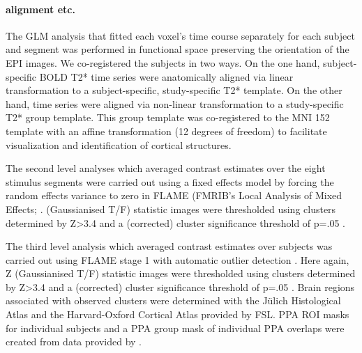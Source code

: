 \documentclass[english]{article}
\begin{document}
\paragraph{alignment etc.}

The GLM analysis that fitted each voxel's time course separately for each
subject and segment was performed in functional space preserving the orientation
of the EPI images.
We co-registered the subjects in two ways.
On the one hand, subject-specific BOLD T2* time series were anatomically aligned
via linear transformation to a subject-specific, study-specific T2* template.
On the other hand, time series were aligned via non-linear transformation to a
study-specific T2* group template.
This group template was co-registered to the MNI 152 template with an affine
transformation (12 degrees of freedom) to facilitate visualization and
identification of cortical structures.

The second level analyses which averaged contrast estimates over the eight
stimulus segments were carried out using a fixed effects model by forcing the
random effects variance to zero in FLAME (FMRIB's Local Analysis of Mixed
Effects; \citep{beckmann2003general, woolrich2004multilevel}.
(Gaussianised T/F) statistic images were thresholded using clusters determined
by Z>3.4 and a (corrected) cluster significance threshold of p=.05
\citep{worsley2001statistical}.

The third level analysis which averaged contrast estimates over subjects was
carried out using FLAME stage 1 with automatic outlier detection
\citep{beckmann2003general, woolrich2004multilevel, woolrich2008robust}.
Here again, Z (Gaussianised T/F) statistic images were thresholded using
clusters determined by Z>3.4 and a (corrected) cluster significance threshold of
p=.05 \citep{worsley2001statistical}.
Brain regions associated with observed clusters were determined with the Jülich
Histological Atlas \citep{eickhoff2005toolbox, eickhoff2007assignment} and the
Harvard-Oxford Cortical Atlas \citep{desikan2006automated} provided by FSL.
PPA ROI masks for individual subjects and a PPA group mask of individual PPA
overlaps were created from data provided by \citep{sengupta2016extension}.
\end{document}
